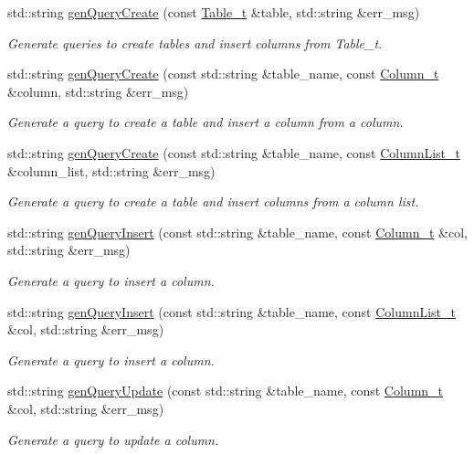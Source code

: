 \begin{DoxyCompactItemize}
std\+::string \hyperlink{classsf_1_1Fetcher_a6c12731a724a6a142e2281b45520eaa9}{gen\+Query\+Create} (const \hyperlink{namespacesf_a11fc7064fe56167aaff3e5fea85ac7a2}{Table\+\_\+t} \&table, std\+::string \&err\+\_\+msg)
\begin{DoxyCompactList}\small\item\em Generate queries to create tables and insert columns from Table\+\_\+t. \end{DoxyCompactList}\item 
std\+::string \hyperlink{classsf_1_1Fetcher_a6a49181b22e198a9e026d8df645f2dc2}{gen\+Query\+Create} (const std\+::string \&table\+\_\+name, const \hyperlink{namespacesf_a390d6a976138adf32ace872bbd298a30}{Column\+\_\+t} \&column, std\+::string \&err\+\_\+msg)
\begin{DoxyCompactList}\small\item\em Generate a query to create a table and insert a column from a column. \end{DoxyCompactList}\item 
std\+::string \hyperlink{classsf_1_1Fetcher_a2a9ca41a620dc5669d836bd7b3a76e5b}{gen\+Query\+Create} (const std\+::string \&table\+\_\+name, const \hyperlink{namespacesf_a1307fc2d55d71a89cf1ac82655a9b1eb}{Column\+List\+\_\+t} \&column\+\_\+list, std\+::string \&err\+\_\+msg)
\begin{DoxyCompactList}\small\item\em Generate a query to create a table and insert columns from a column list. \end{DoxyCompactList}\item 
std\+::string \hyperlink{classsf_1_1Fetcher_afbf3136935c57a7ebc7099736317045a}{gen\+Query\+Insert} (const std\+::string \&table\+\_\+name, const \hyperlink{namespacesf_a390d6a976138adf32ace872bbd298a30}{Column\+\_\+t} \&col, std\+::string \&err\+\_\+msg)
\begin{DoxyCompactList}\small\item\em Generate a query to insert a column. \end{DoxyCompactList}\item 
std\+::string \hyperlink{classsf_1_1Fetcher_a52a84a42b41437053d76fc50b25a96f1}{gen\+Query\+Insert} (const std\+::string \&table\+\_\+name, const \hyperlink{namespacesf_a1307fc2d55d71a89cf1ac82655a9b1eb}{Column\+List\+\_\+t} \&col, std\+::string \&err\+\_\+msg)
\begin{DoxyCompactList}\small\item\em Generate a query to insert a column. \end{DoxyCompactList}\item 
std\+::string \hyperlink{classsf_1_1Fetcher_a56132c7d0d418133d1ad5db4c3749aed}{gen\+Query\+Update} (const std\+::string \&table\+\_\+name, const \hyperlink{namespacesf_a390d6a976138adf32ace872bbd298a30}{Column\+\_\+t} \&col, std\+::string \&err\+\_\+msg)
\begin{DoxyCompactList}\small\item\em Generate a query to update a column. \end{DoxyCompactList}\end{DoxyCompactItemize}


